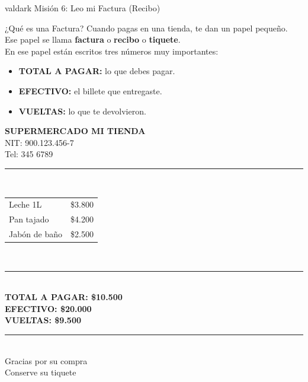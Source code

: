 \documentclass[12pt]{article}
\begin{document}
\begin{mision}{valdark}{\; Misión 6: Leo mi Factura (Recibo)}

\begin{aprender}{¿Qué es una Factura?}
Cuando pagas en una tienda, te dan un papel pequeño.\\
Ese papel se llama \textbf{factura} o \textbf{recibo} o \textbf{tiquete}.\\[0.2cm]
En ese papel están escritos tres números muy importantes:
\begin{itemize}[itemsep=0.2cm]
  \item \textbf{TOTAL A PAGAR:} lo que debes pagar.
  \item \textbf{EFECTIVO:} el billete que entregaste.
  \item \textbf{VUELTAS:} lo que te devolvieron.
\end{itemize}
\end{aprender}

\vspace{0.4cm}

\begin{tcolorbox}[colback=white, colframe=valdark,
    arc=1mm, boxrule=2pt, width=9cm, center]
  \begin{center}
    \textbf{SUPERMERCADO MI TIENDA}\\
    NIT: 900.123.456-7\\
    Tel: 345 6789\\
    \rule{7cm}{0.4pt}\\[0.1cm]
    \begin{tabular}{lr}
      Leche 1L      & \$3.800 \\
      Pan tajado    & \$4.200 \\
      Jabón de baño & \$2.500 \\
    \end{tabular}\\
    \rule{7cm}{0.4pt}\\[0.1cm]
    \textbf{TOTAL A PAGAR: \$10.500}\\[0.1cm]
    \textbf{EFECTIVO:\hspace{1.4cm} \$20.000}\\[0.1cm]
    \textbf{VUELTAS:\hspace{1.55cm} \$9.500}\\[0.1cm]
    \rule{7cm}{0.4pt}\\
    \small{Gracias por su compra}\\
    \small{Conserve su tiquete}
  \end{center}
\end{tcolorbox}


\end{mision}
\end{document}
